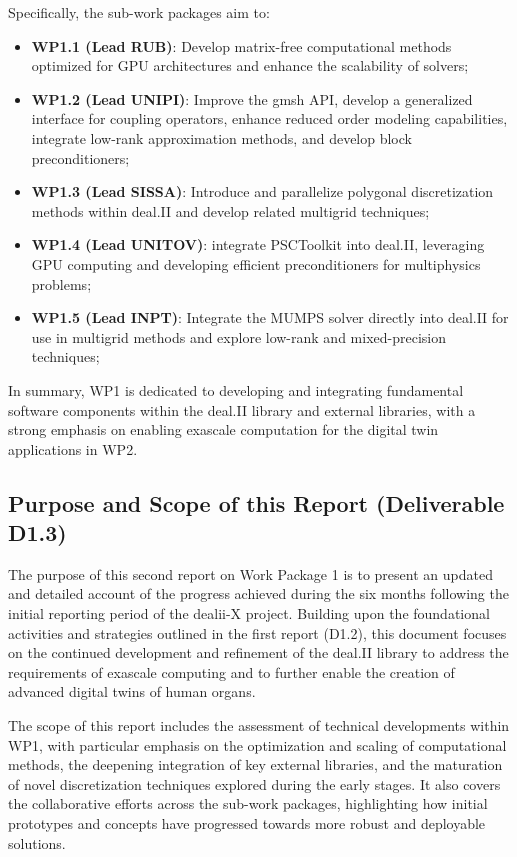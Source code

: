 \documentclass[a4paper,12pt]{article}
\begin{document}
Specifically, the sub-work packages aim to:
\begin{itemize}
    \item \textbf{WP1.1 (Lead RUB)}: Develop matrix-free computational methods optimized for GPU architectures and enhance the scalability of solvers;
    \item \textbf{WP1.2 (Lead UNIPI)}: Improve the gmsh API, develop a generalized interface for coupling operators, enhance reduced order modeling capabilities, integrate low-rank approximation methods, and develop block preconditioners;
    \item \textbf{WP1.3 (Lead SISSA)}: Introduce and parallelize polygonal discretization methods within deal.II and develop related multigrid techniques;
    \item \textbf{WP1.4 (Lead UNITOV)}: integrate PSCToolkit into deal.II, leveraging GPU computing and developing efficient preconditioners for multiphysics problems;
    \item \textbf{WP1.5 (Lead INPT)}: Integrate the MUMPS solver directly into deal.II for use in multigrid methods and explore low-rank and mixed-precision techniques;
\end{itemize}

In summary, WP1 is dedicated to developing and integrating fundamental software components within the deal.II library and external libraries, with a strong emphasis on enabling exascale computation for the digital twin applications in WP2.

\subsection{Purpose and Scope of this Report (Deliverable D1.3)}

The purpose of this second report on Work Package 1 is to present an updated and detailed account of the progress achieved during the six months following the initial reporting period of the dealii-X project. Building upon the foundational activities and strategies outlined in the first report (D1.2), this document focuses on the continued development and refinement of the deal.II library to address the requirements of exascale computing and to further enable the creation of advanced digital twins of human organs.

The scope of this report includes the assessment of technical developments within WP1, with particular emphasis on the optimization and scaling of computational methods, the deepening integration of key external libraries, and the maturation of novel discretization techniques explored during the early stages. It also covers the collaborative efforts across the sub-work packages, highlighting how initial prototypes and concepts have progressed towards more robust and deployable solutions.
\end{document}
